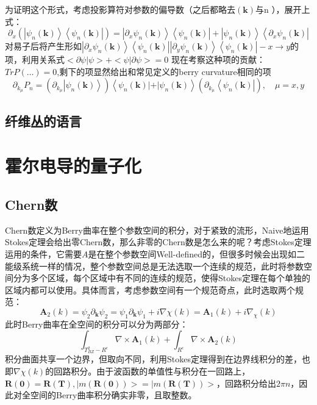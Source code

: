 \documentclass[10pt,openany]{book}
\theoremstyle{thmstyle} %
\theoremstyle{defstyle} %
\theoremstyle{prostyle} %
\begin{document}
为证明这个形式，考虑投影算符对参数的偏导数（之后都略去$ (\mathbf{k}) $与n ），展开上式：
\begin{equation}
  \partial_x (\left|\psi_n(\mathbf{k})\right\rangle\left\langle\psi_n(\mathbf{k})\right|) = 
  \left|\partial_x \psi_n(\mathbf{k})\right\rangle\left\langle \psi_n(\mathbf{k})\right| + \left|\psi_n(\mathbf{k})\right\rangle\left\langle\partial_x\psi_n(\mathbf{k})\right|
\end{equation}
对易子后将产生形如$ \left|\partial_x \psi_n(\mathbf{k})\right\rangle\left\langle \psi_n(\mathbf{k})\right|\left|\partial_y \psi_n(\mathbf{k})\right\rangle\left\langle \psi_n(\mathbf{k})\right| - {x\to y}$的项，利用关系式$ <\partial \psi|\psi> + <\psi|\partial\psi> = 0 $ 现在考察这种项的贡献：
$ Tr{P(\dots)} = 0$,剩下的项显然给出和常见定义的berry curvature相同的项  
\begin{equation}
  \partial_{k_\mu} P_n=\left(\partial_{k_\mu}\left|\psi_n(\mathbf{k})\right\rangle\right)\left\langle\psi_n(\mathbf{k})|+| \psi_n(\mathbf{k})\right\rangle\left(\partial_{k_\mu}\left\langle\psi_n(\mathbf{k})\right|\right), \quad \mu=x, y
\end{equation} 

\subsection{纤维丛的语言}
\section{霍尔电导的量子化}
\subsection{Chern数}
Chern数定义为Berry曲率在整个参数空间的积分，对于紧致的流形，Naive地运用Stokes定理会给出零Chern数，那么非零的Chern数是怎么来的呢？考虑Stokes定理运用的条件，它需要$ A $是在整个参数空间Well-defined的，但很多时候会出现如二能级系统一样的情况，整个参数空间总是无法选取一个连续的规范，此时将参数空间分为多个区域，每个区域中有不同的连续的规范，使得Stokes定理在每个单独的区域内都可以使用。具体而言，考虑参数空间有一个规范奇点，此时选取两个规范：
\begin{equation}
	\mathbf{A}_2(k)=\psi_2 \partial_{\mathbf{k}} \psi_2=\psi_1 \partial_{\mathbf{k}} \psi_1+i \nabla \chi(k)=\mathbf{A}_1(k)+i \nabla_\chi(k)
\end{equation} 
此时Berry曲率在全空间的积分可以分为两部分：
\begin{equation}
	\int_{T_{BZ}^2-R^\epsilon} \nabla \times \mathbf{A}_1(k)+\int_{R^\epsilon} \nabla \times \mathbf{A}_2(k)
\end{equation}
积分曲面共享一个边界，但取向不同，利用Stokes定理得到在边界线积分的差，也即$ \nabla \chi(k) $的回路积分。由于波函数的单值性与积分在一回路上，$ \mathbf{R(0)}=\mathbf{R(T)},|m(\mathbf{R(0)})> =|m(\mathbf{R(T)})>$，回路积分给出$ 2\pi n $，因此对全空间的Berry曲率积分确实非零，且取整数。  
\end{document}

